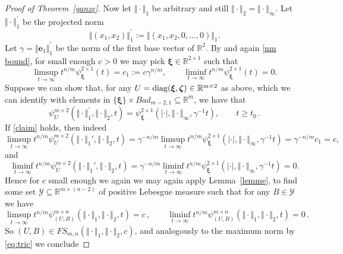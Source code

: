 \documentclass[10pt]{amsart}
\theoremstyle{definition}
\newcommand{\ux}{\boldsymbol{\xi}}
\newcommand{\ee}{\boldsymbol{e}}
\newcommand{\uz}{\boldsymbol{\zeta}}
\newcommand{\R}{\mathbb{R}}
\begin{document}
\begin{proof}[Proof of Theorem~\ref{ganze}]
    Now let $\Vert \cdot\Vert_1$ be arbitrary and still $\Vert\cdot\Vert_2=\Vert \cdot\Vert_{\infty}$. Let $\Vert\cdot \Vert_1^{\prime}$
    be the projected norm
    \[
    \Vert (x_1,x_2)\Vert_1^{\prime}
    := \Vert (x_1,x_2,0,\ldots,0)\Vert_1.
    \]
    Let $\gamma= \Vert\ee_1\Vert_1^{\prime}$ be the norm of the first base vector of $\R^2$. By \cite[Theorem 2.2]{j1} and again \eqref{nm bound}, for small enough $c>0$ we may pick $\ux\in\R^{2\times 1}$ such that 
      \begin{equation} \label{eq:invo}
    \limsup_{t\to\infty} t^{n/m} \psi^{ 2\times1}_{\ux}(t) = c_1:=c \gamma^{n/m}, \qquad \liminf_{t\to\infty} t^{n/m} \psi^{2\times1}_{\ux}(t) = 0.
    \end{equation}
    Suppose we can show that, for any $U= \rm{diag}(\ux,\uz)\in \R^{m\times 2}$ as above, which we can identify with elements in $\{ \ux\}\times Bad_{m-2,1}\subseteq \R^{m}$, we have that
     \begin{equation} \label{claim}
    \psi_U^{m\times 2}(\Vert\cdot\Vert_1^{\prime}, \Vert\cdot\Vert_2,t) = \psi_{\ux}^{2\times 1}(|\cdot |,\Vert \cdot\Vert_{\infty},\gamma^{-1} t),\qquad t\ge t_0 \, .
    \end{equation}
    If \eqref{claim} holds, then indeed
    \[
    \limsup_{t\to\infty} t^{n/m} \psi_U^{m\times 2}(\Vert\cdot\Vert_{1}',\Vert\cdot\Vert_{2},t) =\gamma^{-n/m}  \limsup_{t\to\infty} t^{n/m} \psi_{\ux}^{2\times 1}(|\cdot |,\Vert \cdot\Vert_{\infty},\gamma^{-1} t)= \gamma^{-n/m} c_1=c,
    \]
    and
    \[
    \liminf_{t\to\infty} t^{n/m}\psi_U^{m\times 2}(\Vert\cdot\Vert_{1}',\Vert\cdot\Vert_{2},t) = \gamma^{-n/m} \liminf_{t\to\infty}t^{n/m}\psi_{\ux}^{2\times 1}(|\cdot |,\Vert \cdot\Vert_{\infty},\gamma^{-1} t)= 0.
    \]
    Hence for $c$ small enough we again we may again apply 
    Lemma~\ref{lemme}, to find some set $\mathcal{Y}\subseteq \R^{m\times (n-2)}$ of positive Lebesgue measure
    such that for any $B\in \mathcal{Y}$ we have \begin{equation*}
        \limsup_{t\to\infty} t^{n/m}\psi^{m\times n}_{(U,B)}(\Vert\cdot\Vert_{1},\Vert\cdot\Vert_{2},t)=c \, ,\qquad \liminf_{t\to\infty} t^{n/m}\psi^{m\times n}_{(U,B)}(\Vert\cdot\Vert_{1},\Vert\cdot\Vert_{2},t)=0\, .
    \end{equation*}
    So $(U,B)\in FS_{m,n}(\Vert\cdot\Vert_{1},\Vert\cdot\Vert_{2},c)$, and analogously to the maximum norm by \eqref{eq:tric} we conclude

\end{proof}
\end{document}
